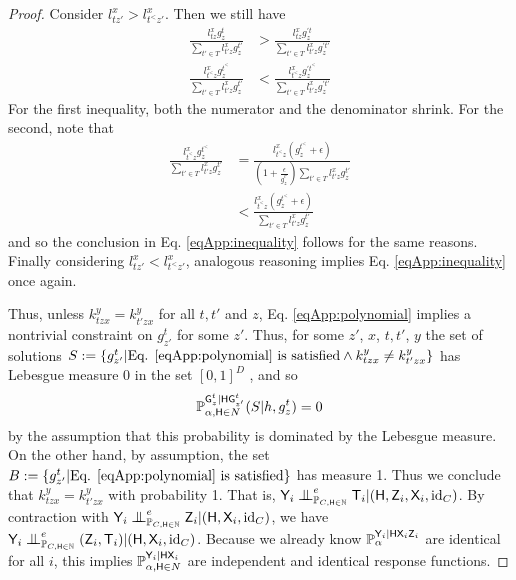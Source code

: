 \begin{proof}
Consider $l^x_{tz'}> l^x_{t^<z'}$. Then we still have
\begin{align}
    \frac{l^x_{tz}g^t_z}{\sum_{t'\in T}l^x_{t'z}g^{t'}_z} &> \frac{l^x_{tz}g^{\prime t}_z}{\sum_{t'\in T}l^x_{t'z}g^{\prime t'}_z}\\
    \frac{l^x_{t^<z}g^{t^<}_z}{\sum_{t'\in T}l^x_{t'z}g^{t'}_z} &< \frac{l^x_{t^<z}g^{\prime t^<}_z}{\sum_{t'\in T}l^x_{t'z}g^{\prime t'}_z}
\end{align}
For the first inequality, both the numerator and the denominator shrink. For the second, note that
\begin{align}
    \frac{l^x_{t^<z}g^{t^<}_z}{\sum_{t'\in T}l^x_{t'z}g^{t'}_z} &= \frac{l^x_{t^<z}(g^{t^<}_z+\epsilon)}{(1+\frac{\epsilon}{g^{t'}_z})\sum_{t'\in T}l^x_{t'z}g^{t'}_z}\\
    &< \frac{l^x_{t^<z}(g^{t^<}_z+\epsilon)}{\sum_{t'\in T}l^x_{t'z}g^{t'}_z}
\end{align}
and so the conclusion in Eq. \eqref{eqApp:inequality} follows for the same reasons. Finally considering $l^x_{tz'}< l^x_{t^<z'}$, analogous reasoning implies Eq. \eqref{eqApp:inequality} once again.

Thus, unless $k^y_{tzx}=k^y_{t'zx}$ for all $t,t'$ and $z$, Eq. \eqref{eqApp:polynomial} implies a nontrivial constraint on  $g^t_{z'}$ for some $z'$. Thus, for some $z'$, $x$, $t,t'$, $y$ the set of solutions $S:=\{g^t_{z'}|\text{Eq. \eqref{eqApp:polynomial} is satisfied}\land k^y_{tzx}\neq k^y_{t'zx}\}$ has Lebesgue measure 0 in the set $[0,1]^{D}$ \citep{okamoto_distinctness_1973}, and so
\begin{align}
    \mathbb{P}_{\alpha,\mathsf{H}\in N}^{\mathsf{G}^t_{z}|\mathsf{H}\mathsf{G}^t_{z'}}(S|h,g^t_{z}) = 0
\end{align}
by the assumption that this probability is dominated by the Lebesgue measure. On the other hand, by assumption, the set $B:=\{g^t_{z'}|\text{Eq. \eqref{eqApp:polynomial} is satisfied}\}$ has measure 1. Thus we conclude that $k^y_{tzx}=k^y_{t'zx}$ with probability 1. That is, $\RV{Y}_i\CI_{\prob{P}_{C,\RV{H}\in\mathbb{N}}}^e \RV{T}_i|(\RV{H},\RV{Z}_i,\RV{X}_i,\text{id}_C)$. By contraction with $\RV{Y}_i\CI^e_{\prob{P}_{C,\RV{H}\in\mathbb{N}}} \RV{Z}_i|(\RV{H},\RV{X}_i,\text{id}_C)$, we have $\RV{Y}_i\CI^e_{\prob{P}_{C,\RV{H}\in\mathbb{N}}} (\RV{Z}_i,\RV{T}_i)|(\RV{H},\RV{X}_i,\text{id}_C)$. Because we already know $\mathbb{P}_\alpha^{\mathsf{Y}_i|\mathsf{H}\mathsf{X}_i\mathsf{Z}_i}$ are identical for all $i$, this implies $\mathbb{P}_{\alpha,\mathsf{H}\in N}^{\mathsf{Y}_i|\mathsf{H}\mathsf{X}_i}$ are independent and identical response functions.
\end{proof}